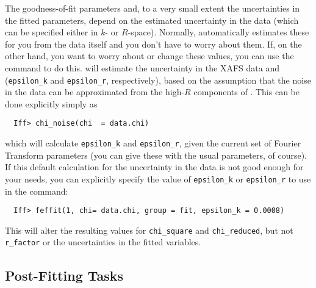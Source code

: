 The goodness-of-fit parameters and, to a very small extent the
uncertainties in the fitted parameters, depend on the estimated uncertainty
in the data (which can be specified either in $k$- or $R$-space).
Normally, {} automatically estimates these for you from the
data itself and you don't have to worry about them.  If, on the other hand,
you want to worry about or change these values, you can use the
{} command to do this.  {} will estimate
the uncertainty in the XAFS data {\chik} and {\chir} ({\texttt{epsilon\_k}}
and {\texttt{epsilon\_r}}, respectively), based on the assumption that the
noise in the data can be approximated from the high-$R$ components of
{\chik}.  This can be done explicitly simply as
{  }
\begin{verbatim}
  Iff> chi_noise(chi  = data.chi)
\end{verbatim}
\noindent
which will calculate {\texttt{epsilon\_k}} and {\texttt{epsilon\_r}}, given
the current set of Fourier Transform parameters (you can give these with
the usual parameters, of course).  If this default calculation for the
uncertainty in the data is not good enough for your needs,  you can
explicitly  specify the value of {\texttt{epsilon\_k}} or
{\texttt{epsilon\_r}} to use in the {} command:
\begin{verbatim}
  Iff> feffit(1, chi= data.chi, group = fit, epsilon_k = 0.0008)
\end{verbatim}
\noindent
This will alter the resulting values for {\texttt{chi\_square}} and
{\texttt{chi\_reduced}}, but not {\texttt{r\_factor}} or the uncertainties
in the fitted variables.

\subsection{Post-Fitting Tasks} \label{Ch:FEFFIT-post}

